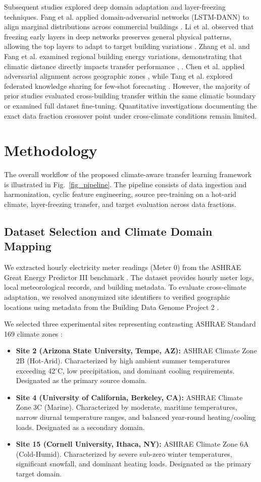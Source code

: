 \documentclass[conference]{IEEEtran}
\begin{document}
Subsequent studies explored deep domain adaptation and layer-freezing techniques. Fang et al. applied domain-adversarial networks (LSTM-DANN) to align marginal distributions across commercial buildings \cite{b12}. Li et al. observed that freezing early layers in deep networks preserves general physical patterns, allowing the top layers to adapt to target building variations \cite{b13}. Zhang et al. and Fang et al. examined regional building energy variations, demonstrating that climatic distance directly impacts transfer performance \cite{b15}, \cite{b16}. Chen et al. applied adversarial alignment across geographic zones \cite{b17}, while Tang et al. explored federated knowledge sharing for few-shot forecasting \cite{b18}. However, the majority of prior studies evaluated cross-building transfer within the same climatic boundary or examined full dataset fine-tuning. Quantitative investigations documenting the exact data fraction crossover point under cross-climate conditions remain limited.

\section{Methodology}
The overall workflow of the proposed climate-aware transfer learning framework is illustrated in Fig.~\ref{fig_pipeline}. The pipeline consists of data ingestion and harmonization, cyclic feature engineering, source pre-training on a hot-arid climate, layer-freezing transfer, and target evaluation across data fractions.

\subsection{Dataset Selection and Climate Domain Mapping}
We extracted hourly electricity meter readings (Meter 0) from the ASHRAE Great Energy Predictor III benchmark \cite{b1}. The dataset provides hourly meter logs, local meteorological records, and building metadata. To evaluate cross-climate adaptation, we resolved anonymized site identifiers to verified geographic locations using metadata from the Building Data Genome Project 2 \cite{b2}.

We selected three experimental sites representing contrasting ASHRAE Standard 169 climate zones \cite{b20}:
\begin{itemize}
    \item \textbf{Site 2 (Arizona State University, Tempe, AZ):} ASHRAE Climate Zone 2B (Hot-Arid). Characterized by high ambient summer temperatures exceeding 42$^\circ$C, low precipitation, and dominant cooling requirements. Designated as the primary source domain.
    \item \textbf{Site 4 (University of California, Berkeley, CA):} ASHRAE Climate Zone 3C (Marine). Characterized by moderate, maritime temperatures, narrow diurnal temperature ranges, and balanced year-round heating/cooling loads. Designated as a secondary domain.
    \item \textbf{Site 15 (Cornell University, Ithaca, NY):} ASHRAE Climate Zone 6A (Cold-Humid). Characterized by severe sub-zero winter temperatures, significant snowfall, and dominant heating loads. Designated as the primary target domain.
\end{itemize}
\end{document}
